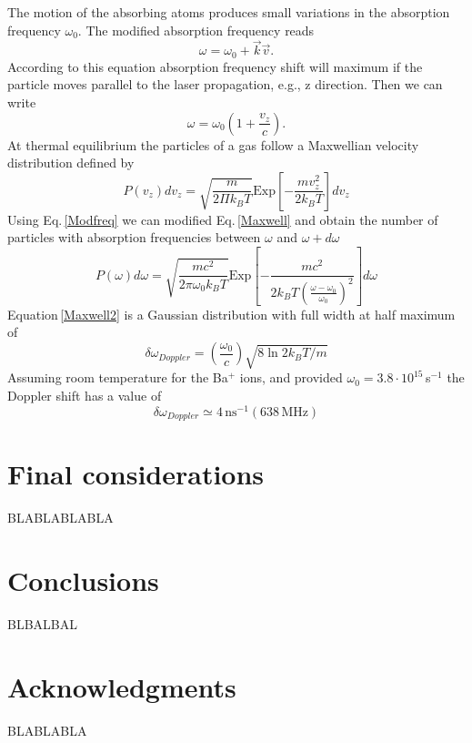 The motion of the absorbing atoms produces small variations in the absorption frequency $\omega_0$. The modified absorption frequency reads
\begin{equation}
\omega=\omega_0+\vec{k}\vec{v}.
\end{equation}
According to this equation absorption frequency shift will maximum if the particle moves parallel to the laser propagation, e.g., z direction. Then we can write
\begin{equation}
\label{Modfreq}
\omega=\omega_0\left(1+\frac{v_z}{c}\right).
\end{equation}
At thermal equilibrium the particles of a gas follow a Maxwellian velocity distribution defined by
\begin{equation}
\label{Maxwell}
P(v_z)dv_z=\sqrt{\frac{m}{2\Pi k_B T}}\text{Exp}\left[-\frac{mv_z^2}{2k_BT}\right]dv_z
\end{equation}
Using Eq.\,\ref{Modfreq} we can modified Eq.\,\ref{Maxwell} and obtain the number of particles with absorption frequencies between $\omega$ and $\omega+d\omega$
\begin{equation}
\label{Maxwell2}
P(\omega)d\omega=\sqrt{\frac{mc^2}{2\pi \omega_0 k_B T}}\text{Exp}\left[-\frac{mc^2}{2k_BT\left(\frac{\omega-\omega_0}{\omega_0}\right)^2}\right]d\omega
\end{equation}
Equation\,\ref{Maxwell2} is a Gaussian distribution with full width at half maximum of
\begin{equation}
\delta\omega_{Doppler}=\left(\frac{\omega_0}{c}\right)\sqrt{8\ln2k_BT/m}
\end{equation}
Assuming room temperature for the Ba$^+$ ions, and provided $\omega_0=3.8\cdot10^{15}$\,s$^{-1}$ the Doppler shift has a value of
\begin{equation}
\delta\omega_{Doppler}\simeq4\,\text{ns}^{-1} (638\,\text{MHz})
\end{equation}

\section{Final considerations}
BLABLABLABLA
\section{Conclusions}
BLBALBAL
\section{Acknowledgments}
BLABLABLA



%
%
%
%
%
%
%
%
%

